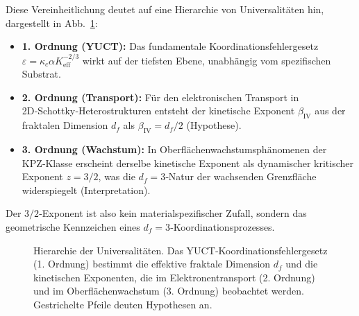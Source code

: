 \documentclass[12pt,a4paper]{article}
\begin{document}
	Diese Vereinheitlichung deutet auf eine Hierarchie von Universalitäten hin,
	dargestellt in Abb.~\ref{fig:hierarchy}:
	\begin{itemize}
		\item \textbf{1. Ordnung (YUCT):} Das fundamentale Koordinationsfehlergesetz
		$\varepsilon = \kappa_c \alpha K_{\mathrm{eff}}^{-2/3}$ wirkt auf der
		tiefsten Ebene, unabhängig vom spezifischen Substrat.
		\item \textbf{2. Ordnung (Transport):} Für den elektronischen Transport in
		2D‑Schottky‑Heterostrukturen entsteht der kinetische Exponent
		$\beta_{\mathrm{IV}}$ aus der fraktalen Dimension $d_f$ als
		$\beta_{\mathrm{IV}} = d_f/2$ (Hypothese).
		\item \textbf{3. Ordnung (Wachstum):} In Oberflächenwachstumsphänomenen der
		KPZ‑Klasse erscheint derselbe kinetische Exponent als dynamischer
		kritischer Exponent $z = 3/2$, was die $d_f = 3$‑Natur der wachsenden
		Grenzfläche widerspiegelt (Interpretation).
	\end{itemize}
	Der $3/2$‑Exponent ist also kein materialspezifischer Zufall, sondern das
	geometrische Kennzeichen eines $d_f = 3$‑Koordinationsprozesses.
	
	\begin{figure}[htbp]
		\centering
		\caption{Hierarchie der Universalitäten. Das YUCT‑Koordinationsfehlergesetz
			(1. Ordnung) bestimmt die effektive fraktale Dimension $d_f$ und die
			kinetischen Exponenten, die im Elektronentransport (2. Ordnung) und im
			Oberflächenwachstum (3. Ordnung) beobachtet werden. Gestrichelte Pfeile
			deuten Hypothesen an.}
		\label{fig:hierarchy}
	\end{figure}
	
\end{document}
